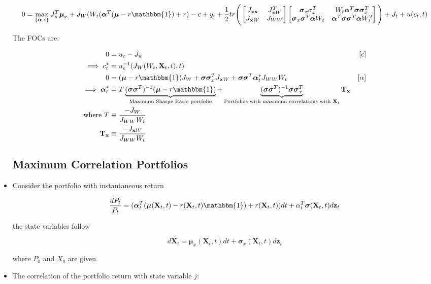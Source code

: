 \documentclass{article}
\newcommand{\xbf}{\mathbf{x}}
\newcommand{\Xbf}{\mathbf{X}}
\newcommand{\zbf}{\mathbf{z}}
\newcommand{\Tbf}{\mathbf{T}}
\newcommand{\mubf}{\boldsymbol{\mu}}
\newcommand{\alphabf}{\boldsymbol{\alpha}}
\newcommand{\sigmabf}{\boldsymbol{\sigma}}
\newcommand{\onebf}{\mathbbm{1}}
\begin{document}
\begin{itemize}
$$
0 
= \max_{\{\alphabf, c\}}J_\xbf^T \mubf_x + J_W (W_t(\alphabf^T(\mubf - r \onebf) + r) - c + y_t 
+ \frac{1}{2} tr \Bigg( 
\begin{bmatrix} J_{\xbf \xbf} & J_{\xbf W}^T  \\ J_{\xbf W} & J_{W W} \end{bmatrix}
\begin{bmatrix} \sigmabf_x \sigma_x^T & W_t \alphabf^T \sigmabf \sigmabf_x^T  \\ \sigmabf_x \sigmabf^T \alphabf  W_t & \alphabf^T \sigmabf \sigmabf^T \alphabf W_t^2 \end{bmatrix}
 \Bigg) + J_t + u(c_t, t)
$$

The FOCs are:

\begin{align*}
0 &= u_c - J_w  & [c] \\
\implies 
c_t^* &= u_c^{-1} (J_W(W_t, \Xbf_t, t), t) \\
0 &= (\mubf - r \onebf) J_W + \sigmabf \sigmabf_x^T J_{\xbf W} + \sigmabf \sigmabf^T \alphabf_t^* J_{WW} W_t & [\alpha] \\
\implies \alphabf_t^* &= T\underbrace{(\sigmabf \sigmabf^T)^{-1} (\mubf - r \onebf)}_{\text{Maximum Sharpe Ratio portfolio}} + \underbrace{(\sigmabf \sigmabf^T)^{-1} \sigmabf \sigmabf_x^T}_{\text{Portfolios with maximum correlations with $\Xbf_t$}} \Tbf_\xbf \\
\text{where } T & \equiv \frac{-J_W}{J_{WW} W_t} \\
\Tbf_\xbf & \equiv \frac{-J_{\xbf W}}{J_{WW} W_t}
\end{align*}

\subsection*{Maximum Correlation Portfolios}

\item Consider the portfolio with instantaneous return 

$$
\frac{dP_t}{P_t} = (\alphabf_t^T (\mubf(\Xbf_t, t) - r(\Xbf_t, t)\onebf) + r(\Xbf_t, t)) dt + \alpha_t^T \sigmabf( \Xbf_t, t) d \zbf_t
$$

the state variables follow

$$
d\Xbf_t = \mubf_x(\Xbf_t, t) dt + \sigmabf_x(\Xbf_t, t) d\zbf_t
$$

where $P_0$ and $X_0$ are given.

\item The correlation of the portfolio return with state variable $j$:


\end{itemize}
\end{document}

